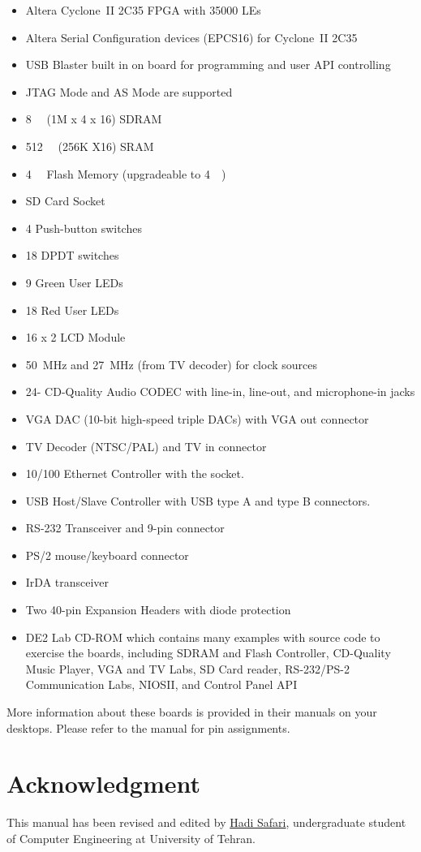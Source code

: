 \documentclass[12pt, logo=tehranDLDL/ut]{tehranDLDL}
\begin{document}
\begin{itemize}
    \item Altera Cyclone~II 2C35 FPGA with 35000 LEs
    \item Altera Serial Configuration devices (EPCS16) for Cyclone~II 2C35
    \item USB Blaster built in on board for programming and user API controlling
    \item JTAG Mode and AS Mode are supported
    \item \SI{8}{\mega\byte} (1M x 4 x 16) SDRAM
    \item \SI{512}{\kilo\byte} (256K X16) SRAM
    \item \SI{4}{\mega\byte} Flash Memory (upgradeable to \SI{4}{\mega\byte})
    \item SD Card Socket
    \item 4 Push-button switches
    \item 18 DPDT switches
    \item 9 Green User LEDs
    \item 18 Red User LEDs
    \item 16 x 2 LCD Module
    \item \SI{50}{\mega\hertz} and \SI{27}{\mega\hertz} (from TV decoder) for clock sources
    \item 24-\SI{}{\bit} CD-Quality Audio CODEC with line-in, line-out, and microphone-in jacks
    \item VGA DAC (10-bit high-speed triple DACs) with VGA out connector
    \item TV Decoder (NTSC/PAL) and TV in connector
    \item 10/100 Ethernet Controller with the socket.
    \item USB Host/Slave Controller with USB type A and type B connectors.
    \item RS-232 Transceiver and 9-pin connector
    \item PS/2 mouse/keyboard connector
    \item IrDA transceiver
    \item Two 40-pin Expansion Headers with diode protection
    \item DE2 Lab CD-ROM which contains many examples with source code to exercise the boards, including SDRAM and Flash Controller,  CD-Quality Music Player, VGA and TV Labs, SD Card reader, RS-232/PS-2 Communication Labs, NIOSII, and Control Panel API
\end{itemize}

More information about these boards is provided in their manuals on your desktops. Please refer to the manual for pin assignments. 

\section*{Acknowledgment}

This manual has been revised and edited by \href{mailto:hadi.safari@ut.ac.ir?subject=[DLDLab]\%20}{Hadi Safari}, undergraduate student of Computer Engineering at University of Tehran.
\end{document}
